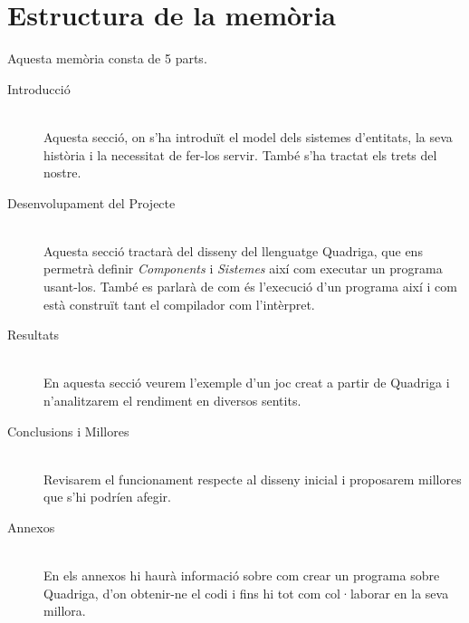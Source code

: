 \section{Estructura de la memòria}

Aquesta memòria consta de 5 parts.

\begin{description}
  \item[Introducció] \hfill \\
    Aquesta secció, on s'ha introduït el model dels sistemes d'entitats, la seva història i la necessitat de fer-los servir. També s'ha tractat els trets del nostre.
    
  \item[Desenvolupament del Projecte] \hfill \\
    Aquesta secció tractarà del disseny del llenguatge Quadriga, que ens permetrà definir {\em Components} i {\em Sistemes} així com executar un programa usant-los. També es parlarà de com és l'execució d'un programa així i com està construït tant el compilador com l'intèrpret.
    
  \item[Resultats] \hfill \\
    En aquesta secció veurem l'exemple d'un joc creat a partir de Quadriga i n'analitzarem el rendiment en diversos sentits.
    
  \item[Conclusions i Millores] \hfill \\
    Revisarem el funcionament respecte al disseny inicial i proposarem millores que s'hi podríen afegir.
  
  \item[Annexos] \hfill \\
    En els annexos hi haurà informació sobre com crear un programa sobre Quadriga, d'on obtenir-ne el codi i fins hi tot com col·laborar en la seva millora.
    
\end{description}